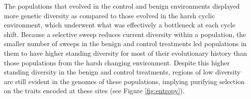 \documentclass[letterpaper]{article}
\begin{document}
The populations that evolved in the control and benign environments displayed more genetic diversity as compared to those evolved in the harsh cyclic environment, which underwent what was effectively 
a bottleneck at each cycle shift. Because a selective sweep reduces current diversity within a population, the smaller number of sweeps
in the benign and control treatments led populations in them to have higher standing diversity for most of their evolutionary history than those populations from the harsh changing environment.  Despite this higher standing diversity in the benign and control treatments, regions of low diversity are still evident in the genomes of these populations, implying purifying selection on the traits encoded at these sites (see Figure \ref{fig:entropy}).
% 
% 
\end{document}
